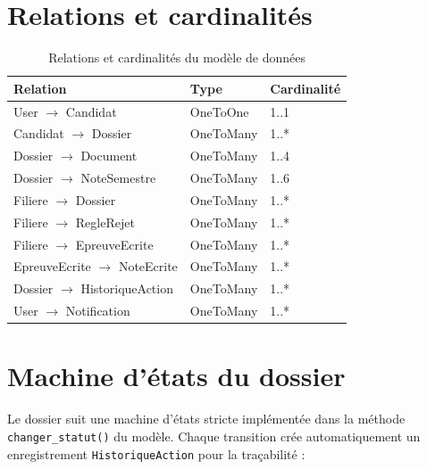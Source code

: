 \section{Relations et cardinalités}
\label{relations-et-cardinalites}

\begin{table}[htbp]
  \centering
  \caption{Relations et cardinalités du modèle de données}
  \begin{tabularx}{\textwidth}{@{} l l X @{}}
    \toprule
    \textbf{Relation} & \textbf{Type} & \textbf{Cardinalité} \\
    \midrule
    User $\rightarrow$ Candidat & OneToOne & 1..1 \\
    Candidat $\rightarrow$ Dossier & OneToMany & 1..* \\
    Dossier $\rightarrow$ Document & OneToMany & 1..4 \\
    Dossier $\rightarrow$ NoteSemestre & OneToMany & 1..6 \\
    Filiere $\rightarrow$ Dossier & OneToMany & 1..* \\
    Filiere $\rightarrow$ RegleRejet & OneToMany & 1..* \\
    Filiere $\rightarrow$ EpreuveEcrite & OneToMany & 1..* \\
    EpreuveEcrite $\rightarrow$ NoteEcrite & OneToMany & 1..* \\
    Dossier $\rightarrow$ HistoriqueAction & OneToMany & 1..* \\
    User $\rightarrow$ Notification & OneToMany & 1..* \\
    \bottomrule
  \end{tabularx}
  \label{tab:relations}
\end{table}

\section{Machine d'états du dossier}
\label{machine-detats-du-dossier}

Le dossier suit une machine d'états stricte implémentée dans la méthode \texttt{changer\_statut()} du modèle. Chaque transition crée automatiquement un enregistrement \texttt{HistoriqueAction} pour la traçabilité :

